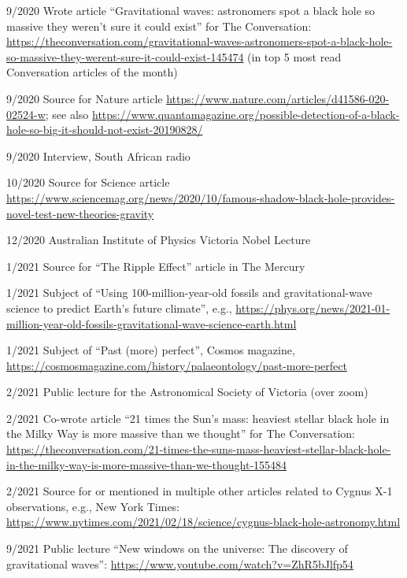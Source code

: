 \documentclass[margin,line]{res}
\begin{document}
\begin{resume}
9/2020	Wrote article ``Gravitational waves: astronomers spot a black hole so massive they weren't sure it could exist'' for The Conversation: \url{https://theconversation.com/gravitational-waves-astronomers-spot-a-black-hole-so-massive-they-werent-sure-it-could-exist-145474} (in top 5 most read Conversation articles of the month)

9/2020	Source for Nature article \url{https://www.nature.com/articles/d41586-020-02524-w}; see also \url{https://www.quantamagazine.org/possible-detection-of-a-black-hole-so-big-it-should-not-exist-20190828/}

9/2020	Interview, South African radio

10/2020	Source for Science article \url{https://www.sciencemag.org/news/2020/10/famous-shadow-black-hole-provides-novel-test-new-theories-gravity}
	  
12/2020	Australian Institute of Physics  Victoria Nobel Lecture

1/2021	Source for ``The Ripple Effect'' article in The Mercury

1/2021 	Subject of ``Using 100-million-year-old fossils and gravitational-wave science to predict Earth's future climate'', e.g., \url{https://phys.org/news/2021-01-million-year-old-fossils-gravitational-wave-science-earth.html}

1/2021	Subject of ``Past (more) perfect'', Cosmos magazine, \url{https://cosmosmagazine.com/history/palaeontology/past-more-perfect}

2/2021 	Public lecture for the Astronomical Society of Victoria (over zoom)

2/2021 	Co-wrote article ``21 times the Sun's mass: heaviest stellar black hole in the Milky Way is more massive than we thought'' for The Conversation: \url{https://theconversation.com/21-times-the-suns-mass-heaviest-stellar-black-hole-in-the-milky-way-is-more-massive-than-we-thought-155484}

2/2021	Source for or mentioned in multiple other articles related to Cygnus X-1 observations, e.g., New York Times: \url{https://www.nytimes.com/2021/02/18/science/cygnus-black-hole-astronomy.html}
	  
9/2021	Public lecture ``New windows on the universe: The discovery of gravitational waves'': \url{https://www.youtube.com/watch?v=ZhR5bJlfp54}
	  
\end{resume}
\end{document}
